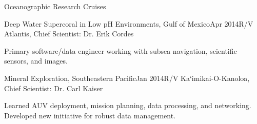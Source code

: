 \documentclass{resume} %
\begin{document}
\begin{rSection}{Oceanographic Research Cruises}
\begin{rSubsection}{Deep Water Supercoral in Low pH Environments, Gulf of Mexico}{Apr 2014}{R/V Atlantis, Chief Scientist: Dr. Erik Cordes}{}
\item{Primary software/data engineer working with subsea navigation, scientific sensors, and images.}
\end{rSubsection}


\begin{rSubsection}{Mineral Exploration, Southeastern Pacific}{Jan 2014}{R/V Ka`imikai-O-Kanoloa, Chief Scientist: Dr. Carl Kaiser}{}
\item{Learned AUV deployment, mission planning, data processing, and networking. Developed new initiative for robust data management.}
\end{rSubsection}

\end{rSection}
\end{document}
